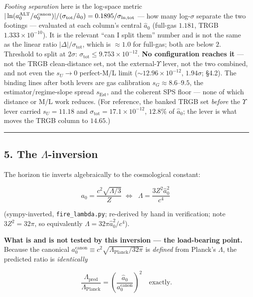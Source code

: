 \documentclass[
]{article}
\newcounter{none} %
\begin{document}
\emph{Footing separation} here is the log-space metric
\(|\ln(a_0^\mathrm{ALT}/a_0^\mathrm{canon})|/(\sigma_\mathrm{tot}/\hat a_0)=0.1895/\sigma_{\ln,\rm tot}\)
--- how many log-\(\sigma\) separate the two footings --- evaluated at
each column's central \(\hat a_0\) (full-gas \(1.181\), TRGB
\(1.333\times10^{-10}\)). It is the relevant ``can I split them'' number
and is not the same as the linear ratio \(|\Delta|/\sigma_\mathrm{tot}\),
which is \(\approx1.0\) for full-gas; both are below \(2\). Threshold to
split at \(2\sigma\): \(\sigma_\mathrm{tot}\le9.753\times10^{-12}\).
\textbf{No configuration reaches it} --- not the TRGB clean-distance
set, not the external-\(\Upsilon\) lever, not the two combined, and not
even the \(s_U\to0\) perfect-M/L limit (\(\sim12.96\times10^{-12}\),
\(1.94\sigma\); §4.2). The binding lines after both levers are gas
calibration \(s_G\approx8.6\)--\(9.5\), the estimator/regime-slope
spread \(s_\mathrm{Est}\), and the coherent SPS floor --- none of which
distance or M/L work reduces. (For reference, the banked TRGB set
\emph{before} the \(\Upsilon\) lever carried \(s_U=11.18\) and
\(\sigma_\mathrm{tot}=17.1\times10^{-12}\), \(12.8\%\) of \(\hat a_0\); the
lever is what moves the TRGB column to \(14.65\).)

\begin{center}\rule{0.5\linewidth}{0.5pt}\end{center}

\subsection{\texorpdfstring{5. The
\(\Lambda\)-inversion}{5. The \textbackslash Lambda-inversion}}\label{the-lambda-inversion}

The horizon tie inverts algebraically to the cosmological constant:

\[a_0=\frac{c^2\sqrt{\Lambda/3}}{Z}\;\Longleftrightarrow\;\boxed{\;\Lambda=\frac{3Z^2\hat a_0^2}{c^4}\;}\]

(sympy-inverted, \texttt{fire\_lambda.py}; re-derived by hand in
verification; note \(3Z^2=32\pi\), so equivalently
\(\Lambda=32\pi\hat a_0^2/c^4\)).

\textbf{What is and is not tested by this inversion --- the load-bearing
point.} Because the canonical
\(a_0^\mathrm{canon}\equiv c^2\sqrt{\Lambda_\mathrm{Planck}/32\pi}\) is
\emph{defined} from Planck's \(\Lambda\), the predicted ratio is
\emph{identically}

\[\frac{\Lambda_\mathrm{pred}}{\Lambda_\mathrm{Planck}}=\left(\frac{\hat a_0}{a_0^\mathrm{canon}}\right)^2\quad\text{exactly.}\]
\end{document}
